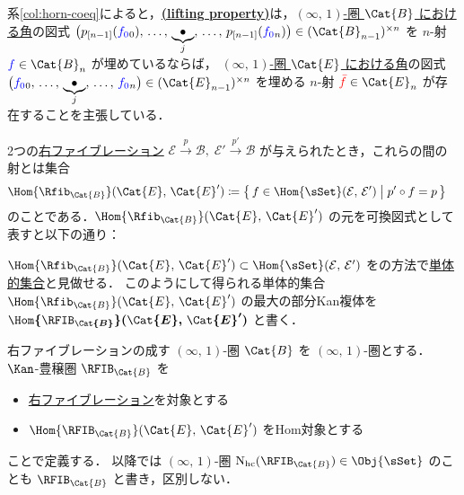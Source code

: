 \documentclass[TQFT_main]{subfiles}
\begin{document}
系\ref{col:horn-coeq}によると，\hyperref[def:infty-R-fib]{\textsf{\textbf{(lifting property)}}}は，\underline{$(\infty,\, 1)$-圏 $\Cat{B}$ における}\hyperref[def:horn]{角}の図式
$\bigl(p_{[n-1]}(\textcolor{blue}{f_0}{}_0),\, \dots,\, \underbrace{\bullet}_{j},\, \dots,\, p_{[n-1]}(\textcolor{blue}{f_0}{}_n)\bigr) \in (\Cat{B}_{n-1})^{\times n}$ を $n$-射 $\textcolor{blue}{f} \in \Cat{B}_n$ が埋めているならば，
\underline{$(\infty,\, 1)$-圏 $\Cat{E}$ における}\hyperref[def:horn]{角}の図式
$\bigl(\textcolor{blue}{f_{0}}{}_0,\, \dots,\, \underbrace{\bullet}_{j},\, \dots,\, \textcolor{blue}{f_0}{}_n\bigr) \in (\Cat{E}_{n-1})^{\times n}$ を埋める $n$-射 $\textcolor{red}{\bar{f}} \in \Cat{E}_n$ が存在することを主張している．

2つの\hyperref[def:infty-fib]{右ファイブレーション} $\mathcal{E} \xrightarrow{p} \mathcal{B},\; \mathcal{E}' \xrightarrow{p'} \mathcal{B}$ が与えられたとき，これらの間の射とは集合
\begin{align}
    \Hom{\Rfib_{\Cat{B}}} (\Cat{E},\, \Cat{E}') &\coloneqq 
    \bigl\{\, f \in \Hom{\sSet}(\mathcal{E},\, \mathcal{E}') \bigm| p' \circ f = p \,\bigr\}
\end{align}
のことである．$\Hom{\Rfib_{\Cat{B}}} (\Cat{E},\, \Cat{E}')$ の元を可換図式として表すと以下の通り：
\begin{center}
\end{center}
$\Hom{\Rfib_{\Cat{B}}} (\Cat{E},\, \Cat{E}') \subset \Hom{\sSet}(\mathcal{E},\, \mathcal{E}')$ をの方法で\hyperref[def:SimpSet]{単体的集合}と見做せる．
このようにして得られる単体的集合 $\Hom{\Rfib_{\Cat{B}}} (\Cat{E},\, \Cat{E}')$ の最大の部分Kan複体を $\bm{\Hom{\RFIB_{\Cat{B}}}(\Cat{E},\, \Cat{E}')}$ と書く．

\begin{mydef}[label=def:RFIB]{右ファイブレーションの成す {$(\infty,\, 1)$}-圏}
    $\Cat{B}$ を $(\infty,\, 1)$-圏とする．
    $\Kan$-豊穣圏 $\RFIB_{\Cat{B}}$ を
    \begin{itemize}
        \item \hyperref[def:infty-fib]{右ファイブレーション}を対象とする
        \item $\Hom{\RFIB_{\Cat{B}}}(\Cat{E},\, \Cat{E}')$ をHom対象とする
    \end{itemize}
    ことで定義する．
    以降では $(\infty,\, 1)$-圏 $\mathrm{N}_{\text{hc}}(\RFIB_{\Cat{B}}) \in \Obj{\sSet}$ のことも $\RFIB_{\Cat{B}}$ と書き，区別しない．
\end{mydef}
\end{document}
